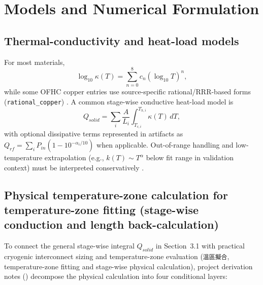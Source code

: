 \documentclass[11pt,a4paper]{article}
\begin{document}
\section{Models and Numerical Formulation}
\subsection{Thermal-conductivity and heat-load models}
For most materials,
\begin{equation}
\log_{10}\kappa(T)=\sum_{n=0}^{8} c_n \left(\log_{10}T\right)^n,
\end{equation}
while some OFHC copper entries use source-specific rational/RRR-based forms (\texttt{rational\_copper}) \cite{simon1992,nist,marquardt,bradley}. A common stage-wise conductive heat-load model is
\begin{equation}
Q_{solid}=\sum_i \frac{A}{L_i}\int_{T_{c,i}}^{T_{h,i}}\kappa(T)\,dT,
\end{equation}
with optional dissipative terms represented in artifacts as $Q_{rf}=\sum_i P_{in}\left(1-10^{-\alpha_i/10}\right)$ when applicable. Out-of-range handling and low-temperature extrapolation (e.g., $k(T)\sim T^\alpha$ below fit range in validation context) must be interpreted conservatively \cite{flynn,raicu2025}.

\subsection{Physical temperature-zone calculation for temperature-zone fitting (stage-wise conduction and length back-calculation)}
To connect the general stage-wise integral $Q_{solid}$ in Section~3.1 with practical cryogenic interconnect sizing and temperature-zone evaluation (\texttt{溫區擬合}, temperature-zone fitting and stage-wise physical calculation), project derivation notes () decompose the physical calculation into four conditional layers:
\end{document}
